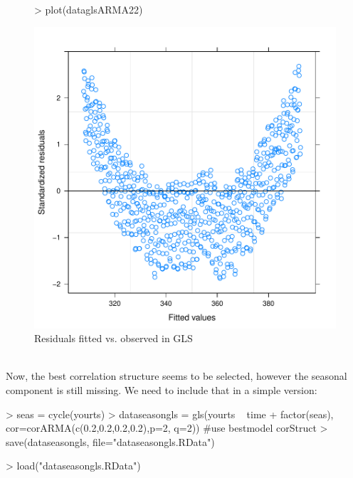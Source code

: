 \documentclass[11pt, a4paper]{article} %
\begin{document}
\begin{figure}[H]
\centering
\begin{Schunk}
\begin{Sinput}
> plot(dataglsARMA22)
\end{Sinput}
\end{Schunk}
\includegraphics{alleselena-residual}
\caption{Residuals fitted vs. observed in GLS}
\label{residual}
\end{figure}\\

\noindent Now, the best correlation structure seems to be selected, however the seasonal component is still missing. We need to include that in a simple version: 


\begin{Schunk}
\begin{Sinput}
> seas = cycle(yourts)
> dataseasongls = gls(yourts ~ time + factor(seas), cor=corARMA(c(0.2,0.2,0.2,0.2),p=2, q=2)) #use bestmodel corStruct
> save(dataseasongls, file="dataseasongls.RData")
\end{Sinput}
\end{Schunk}

\begin{Schunk}
\begin{Sinput}
> load("dataseasongls.RData")
\end{Sinput}
\end{Schunk}
\end{document}
